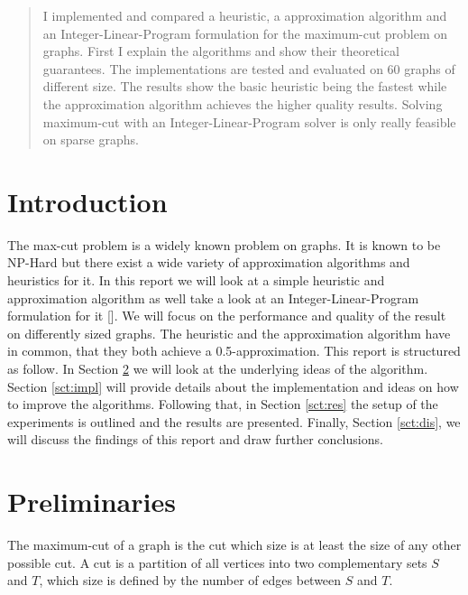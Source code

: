 \documentclass[twocolumn]{article}
\begin{document}


\begin{abstract}
  I implemented and compared a heuristic, a approximation algorithm and an Integer-Linear-Program formulation
  for the maximum-cut problem on graphs. First I explain the algorithms and show their theoretical guarantees.
  The implementations are tested and evaluated on 60 graphs of different size. The results show the basic 
  heuristic being the fastest while the approximation algorithm achieves the higher quality results.
  Solving maximum-cut with an Integer-Linear-Program solver is only really feasible on sparse graphs.
\end{abstract}


\section{Introduction}
The max-cut problem is a widely known problem on graphs. 
It is known to be NP-Hard but there exist a wide variety of approximation algorithms and heuristics for it.
In this report we will look at a simple heuristic and approximation algorithm as well take a look at an
Integer-Linear-Program formulation for it [\cite{algorithms}].
We will focus on the performance and quality of the result on differently sized graphs.
The heuristic and the approximation algorithm have in common, that they both achieve a 0.5-approximation.
This report is structured as follow. In Section \ref{sct:pre} we will look at the underlying ideas of
the algorithm. Section \ref{sct:impl} will provide details about the implementation and ideas on how
to improve the algorithms.
Following that, in Section \ref{sct:res} the setup of the experiments is outlined and the results are presented.
Finally, Section \ref{sct:dis}, we will discuss the findings of this report and draw further conclusions.


\section{Preliminaries}
\label{sct:pre}
The maximum-cut of a graph is the cut which size is at least the size of any other possible cut.
A cut is a partition of all vertices into two complementary sets $S$ and $T$,
which size is defined by the number of edges between $S$ and $T$.
\end{document}
